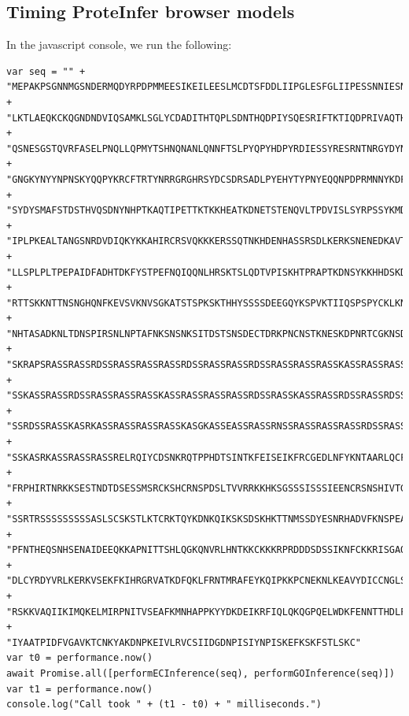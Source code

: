   

\subsection*{Timing ProteInfer browser models}
In the javascript console, we run the following:
\begin{tiny}
\begin{verbatim}
var seq = "" +
"MEPAKPSGNNMGSNDERMQDYRPDPMMEESIKEILEESLMCDTSFDDLIIPGLESFGLIIPESSNNIESNNVEEGSDGE" +
"LKTLAEQKCKQGNDNDVIQSAMKLSGLYCDADITHTQPLSDNTHQDPIYSQESRIFTKTIQDPRIVAQTHRQCTSSASNL" + 
"QSNESGSTQVRFASELPNQLLQPMYTSHNQNANLQNNFTSLPYQPYHDPYRDIESSYRESRNTNRGYDYNFRHHPYRPRG" + 
"GNGKYNYYNPNSKYQQPYKRCFTRTYNRRGRGHRSYDCSDRSADLPYEHYTYPNYEQQNPDPRMNNYKDFTQLTNKFNFE" + 
"SYDYSMAFSTDSTHVQSDNYNHPTKAQTIPETTKTKKHEATKDNETSTENQVLTPDVISLSYRPSSYKMDIIKKIYDTDV" + 
"IPLPKEALTANGSNRDVDIQKYKKAHIRCRSVQKKKERSSQTNKHDENHASSRSDLKERKSNENEDKAVTKARDFSKLNP" + 
"LLSPLPLTPEPAIDFADHTDKFYSTPEFNQIQQNLHRSKTSLQDTVPISKHTPRAPTKDNSYKKHHDSKDNYPKMKHSPG" + 
"RTTSKKNTTNSNGHQNFKEVSVKNVSGKATSTSPKSKTHHYSSSSDEEGQYKSPVKTIIQSPSPYCKLKNPSIMDKNSAK" + 
"NHTASADKNLTDNSPIRSNLNPTAFNKSNSNKSITDSTSNSDECTDRKPNCNSTKNESKDPNRTCGKNSDKHLSKSCTMA" + 
"SKRAPSRASSRASSRDSSRASSRASSRASSRDSSRASSRASSRDSSRASSRASSRASSKASSRASSRASSRASSRDSSRA" + 
"SSKASSRASSRDSSRASSRASSRASSKASSRASSRASSRASSRDSSRASSKASSRASSRDSSRASSRDSSRDSSRASSRA" + 
"SSRDSSRASSKASRKASSRASSRASSRASSKASGKASSEASSRASSRNSSRASSRASSRASSRDSSRASSRASSRDSSRA" + 
"SSKASRKASSRASSRASSRELRQIYCDSNKRQTPPHDTSINTKFEISEIKFRCGEDLNFYKNTAARLQCFNHNDQFYNPR" + 
"FRPHIRTNRKKSESTNDTDSESSMSRCKSHCRNSPDSLTVVRRKKHKSGSSSISSSIEENCRSNSHIVTGKEKFTPFYYQ" + 
"SSRTRSSSSSSSSSASLSCSKSTLKTCRKTQYKDNKQIKSKSDSKHKTTNMSSDYESNRHADVFKNSPEAGEKFPLHNSS" + 
"PFNTHEQSNHSENAIDEEQKKAPNITTSHLQGKQNVRLHNTKKCKKKRPRDDDSDSSIKNFCKKRISGAQKTESEVSEPD" + 
"DLCYRDYVRLKERKVSEKFKIHRGRVATKDFQKLFRNTMRAFEYKQIPKKPCNEKNLKEAVYDICCNGLSNNAAIIMYFT" + 
"RSKKVAQIIKIMQKELMIRPNITVSEAFKMNHAPPKYYDKDEIKRFIQLQKQGPQELWDKFENNTTHDLFTRHSDVKTMI" + 
"IYAATPIDFVGAVKTCNKYAKDNPKEIVLRVCSIIDGDNPISIYNPISKEFKSKFSTLSKC"
var t0 = performance.now()
await Promise.all([performECInference(seq), performGOInference(seq)])
var t1 = performance.now()
console.log("Call took " + (t1 - t0) + " milliseconds.")
    
\end{verbatim}
\end{tiny}


